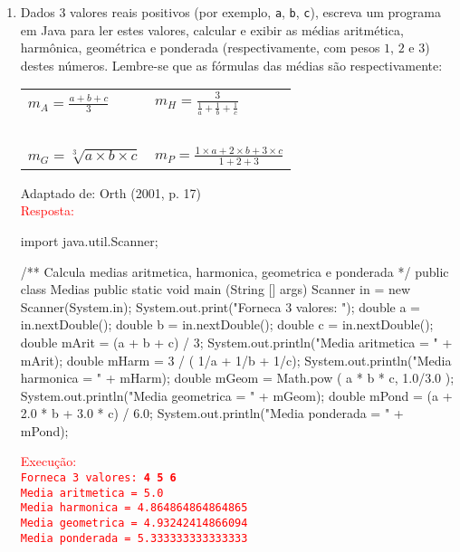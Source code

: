 \documentclass[onecolumn,a4paper,10pt]{report}
\newcommand{\+}{\, + \,}
\newcommand{\<}{\hspace*{-0.4cm}}
\begin{document}
\begin{enumerate}[1.]
\item Dados 3 valores reais positivos (por exemplo, \texttt{a}, \texttt{b}, \texttt{c}), escreva um programa em Java para ler estes valores, calcular e exibir as médias aritmética, harmônica, geométrica e ponderada (respectivamente, com pesos $1$, $2$ e $3$) destes números. Lembre-se que as fórmulas das médias são respectivamente:
\begin{center}
\begin{tabular}{p{4cm}p{5cm}}
$\displaystyle m_A = \frac{a+b+c}{3} $ & $\displaystyle m_H = \frac{3}{\frac{1}{a}+\frac{1}{b}+\frac{1}{c}} $ \\
~ & ~\\
$\displaystyle m_G = \sqrt[3]{a \times b \times c} $ & $\displaystyle m_P = \frac{1 \times a + 2 \times b + 3 \times c}{1+2+3} $ \\
\end{tabular}
\end{center}
{\tiny Adaptado de: Orth (2001, p. 17)}\\
\textcolor{red}{Resposta:}\\
\begin{javacode}
import java.util.Scanner;

/**
   Calcula medias aritmetica, harmonica, geometrica e ponderada
 */
public class Medias {
    public static void main (String [] args) {
        Scanner in = new Scanner(System.in);
        System.out.print("Forneca 3 valores: ");
        double a = in.nextDouble();
        double b = in.nextDouble();
        double c = in.nextDouble();
        double mArit = (a + b + c) / 3;
        System.out.println("Media aritmetica = " + mArit);
        double mHarm = 3 / ( 1/a + 1/b + 1/c);
        System.out.println("Media harmonica = " + mHarm);
        double mGeom = Math.pow ( a * b * c, 1.0/3.0 );
        System.out.println("Media geometrica = " + mGeom);
        double mPond = (a + 2.0 * b + 3.0 * c) / 6.0;
        System.out.println("Media ponderada = " + mPond);
    }
}
\end{javacode}
\textcolor{red}{Execução:\\
\texttt{Forneca 3 valores: \textbf{4 5 6}\\
Media aritmetica = 5.0\\
Media harmonica = 4.864864864864865\\
Media geometrica = 4.93242414866094\\
Media ponderada = 5.333333333333333}
}


\end{enumerate}
\end{document}
